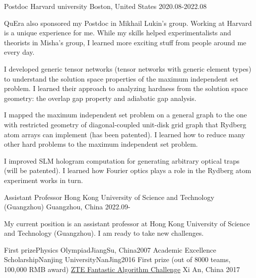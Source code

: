 \documentclass[11pt, a4paper]{awesome-cv}
\begin{document}
\begin{cventries}
  \cventry
    {Postdoc}
    {Harvard university}
    {Boston, United States}
    {2020.08-2022.08}  %
    {
    QuEra also sponsored my Postdoc in Mikhail Lukin's group.
    Working at Harvard is a unique experience for me. While my skills helped experimentalists and theorists in Misha's group, I learned more exciting stuff from people around me every day.
    \vspace{2em}
\begin{cvitems}
\item I developed generic tensor networks (tensor networks with generic element types) to understand the solution space properties of the maximum independent set problem. I learned their approach to analyzing hardness from the solution space geometry: the overlap gap property and adiabatic gap analysis.
\item I mapped the maximum independent set problem on a general graph to the one with restricted geometry of diagonal-coupled unit-disk grid graph that Rydberg atom arrays can implement (has been patented). I learned how to reduce many other hard problems to the maximum independent set problem.
\item I improved SLM hologram computation for generating arbitrary optical traps (will be patented). I learned how Fourier optics plays a role in the Rydberg atom experiment works in turn.
    \end{cvitems}}
  \cventry
    {Assistant Professor}
    {Hong Kong University of Science and Technology (Guangzhou)}
    {Guangzhou, China}
    {2022.09-}  %
    {
\begin{cvitems}
    My current position is an assistant professor at Hong Kong University of Science and Technology (Guangzhou). I am ready to take new challenges.
    \end{cvitems}}

\end{cventries}
%
\begin{cvhonors}
    \cvhonor
    {First prize}{Physics Olympiad}{JiangSu, China}{2007}
    \cvhonor
    {Academic Excellence Scholarship}{Nanjing University}{NanJing}{2016}
    \cvhonor
    {First prize (out of 8000 teams, 100,000 RMB award)} %
    {\href{http://www.iqiyi.com/w\_19rto3v4h1.html}{ZTE Fantastic Algorithm Challenge}} %
    {Xi An, China} %
    {2017} %
\end{cvhonors}
\end{document}
